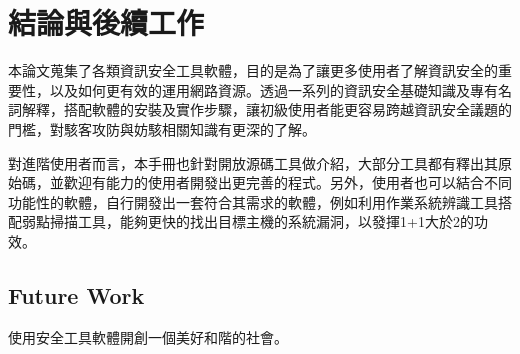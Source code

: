 \renewcommand\thetable{\arabic{chapter}-\arabic{table}}
\chapter{結論與後續工作}
\label{cha:conclusions}


本論文蒐集了各類資訊安全工具軟體，目的是為了讓更多使用者了解資訊安全的重要性，以及如何更有效的運用網路資源。透過一系列的資訊安全基礎知識及專有名詞解釋，搭配軟體的安裝及實作步驟，讓初級使用者能更容易跨越資訊安全議題的門檻，對駭客攻防與妨駭相關知識有更深的了解。

對進階使用者而言，本手冊也針對開放源碼工具做介紹，大部分工具都有釋出其原始碼，並歡迎有能力的使用者開發出更完善的程式。另外，使用者也可以結合不同功能性的軟體，自行開發出一套符合其需求的軟體，例如利用作業系統辨識工具搭配弱點掃描工具，能夠更快的找出目標主機的系統漏洞，以發揮1+1大於2的功效。

\section{Future Work} 
使用安全工具軟體開創一個美好和階的社會。


